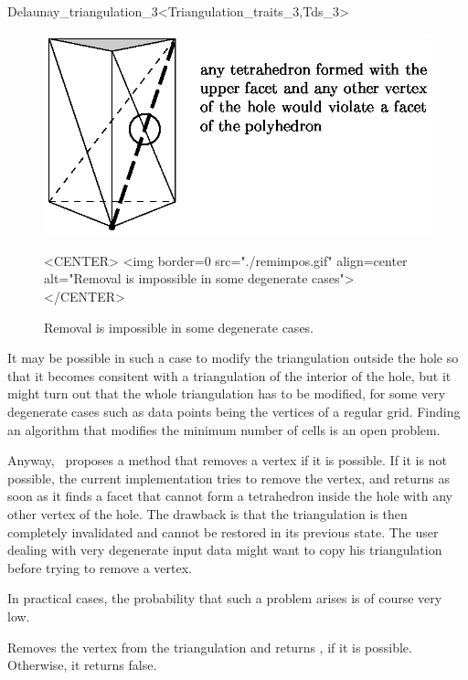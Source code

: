 \begin{ccRefClass}{Delaunay_triangulation_3<Triangulation_traits_3,Tds_3>}
\begin{figure}[htbp]
\begin{ccTexOnly}
\begin{center} 
\includegraphics{remimpos.eps} 
\end{center}
\end{ccTexOnly}
\caption{Removal is impossible in some degenerate cases.
\label{Triangulation3-fig-remimpos}}
\begin{ccHtmlOnly}
<CENTER>
<img border=0 src="./remimpos.gif" align=center alt="Removal is impossible in some degenerate cases">
</CENTER>
\end{ccHtmlOnly}
\end{figure} 

It may be possible in such a case to modify the triangulation outside
the hole so that it becomes consitent with a triangulation of the
interior of the hole, but it might turn out that the whole
triangulation has to be modified, for some very degenerate cases such
as data points being the vertices of a regular grid. Finding an
algorithm that modifies the minimum number of cells is an open problem.

Anyway, \cgal\ proposes a method that removes a vertex if it is
possible. If it is not possible, the current implementation tries to
remove the vertex, and returns  as soon as it finds a facet
that cannot form a tetrahedron inside the hole with any other vertex
of the hole. The drawback is that the triangulation is then completely
invalidated and cannot be restored in its previous state. The user
dealing with very degenerate input data might want to copy his
triangulation before trying to remove a vertex.

In practical cases, the probability that such a problem arises is
of course very low.

{Removes the vertex  from the triangulation and returns
, if it is possible. Otherwise, it returns false.
}


\end{ccRefClass}
